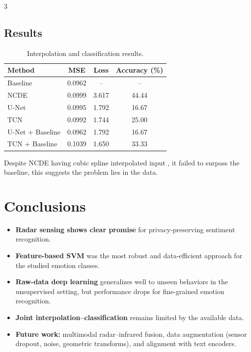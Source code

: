 \documentclass[final]{beamer}
\begin{document}
\begin{frame}[t]
\begin{multicols}{3}
\subsection{Results}
\begin{table}
\centering
\small
\setlength{\tabcolsep}{8pt}
\begin{tabular}{l c c c}
\toprule
\textbf{Method} &
\textbf{MSE} &
\textbf{Loss} &
\textbf{Accuracy (\%)} \\
\midrule
Baseline & 0.0962 & -- & -- \\
NCDE & 0.0999 & 3.617 & 44.44 \\
U-Net & 0.0995 & 1.792 & 16.67 \\
TCN & 0.0992 & 1.744 & 25.00 \\
U-Net + Baseline & 0.0962 & 1.792 & 16.67 \\
TCN + Baseline & 0.1039 & 1.650 & 33.33 \\
\bottomrule
\end{tabular}
\caption{Interpolation and classification results.}
\end{table}
Despite NCDE having cubic spline interpolated input , it failed to surpass the baseline, this suggests the problem lies in the data.
\section{Conclusions}

\begin{itemize}
    \item \textbf{Radar sensing shows clear promise} for privacy-preserving sentiment recognition.
    \item \textbf{Feature-based SVM} was the most robust and data-efficient approach for the studied emotion classes.
    \item \textbf{Raw-data deep learning} generalizes well to unseen behaviors in the unsupervised setting, but performance drops for fine-grained emotion recognition.
    \item \textbf{Joint interpolation--classification} remains limited by the available data.
    \item \textbf{Future work:} multimodal radar--infrared fusion, data augmentation (sensor dropout, noise, geometric transforms), and alignment with text encoders.
\end{itemize}
\end{multicols}

\end{frame}
\end{document}
